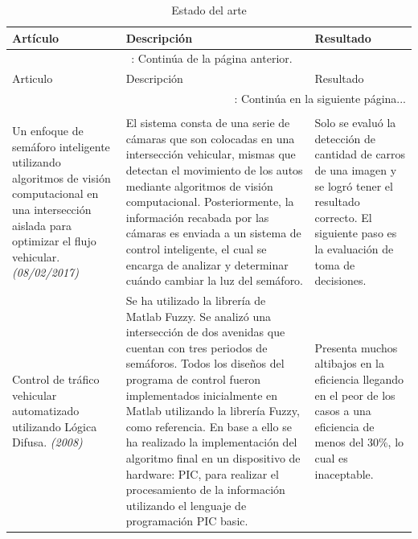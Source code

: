 \begin{center}
	\begin{longtable}{|p{2.7cm}|p{7cm}|p{5.0cm}|}
		

		
		\hline Artículo & Descripción & Resultado \\ \hline
		\endfirsthead
		
		\multicolumn{3}{c}{{\tablename\ \thetable{}: Continúa de la página anterior.}}\\

		\hline Articulo & Descripción & Resultado \\ \hline
		\endhead
		
		\multicolumn{3}{r}{{\tablename\ \thetable{}: Continúa en la siguiente página...}}\\
		\endfoot
		
		\caption[Estado del arte]{Estado del arte}\label{table:estadodelarte}\\
		\endlastfoot
		

		
		Un enfoque de semáforo inteligente utilizando algoritmos de visión computacional en una intersección aislada para optimizar el flujo vehicular.\cite{garciag} \newline \emph{(08/02/2017)} &
		El sistema consta de una serie de cámaras que son colocadas en una intersección vehicular, mismas que detectan el movimiento de los autos mediante algoritmos de visión computacional.
		Posteriormente, la información recabada por las cámaras es enviada a un sistema de control inteligente, el cual se encarga de analizar y determinar cuándo cambiar la luz del semáforo.&
		Solo se evaluó la detección de cantidad de carros de una imagen y se logró tener el resultado correcto. El siguiente paso es la evaluación de toma de decisiones.\\ \hline
		
		
		Control de tráfico vehicular automatizado utilizando Lógica Difusa.\cite{alvaroer} \newline \emph{(2008)} &
		Se ha utilizado la librería de Matlab Fuzzy. Se analizó una intersección de dos avenidas que cuentan con tres periodos de semáforos.  Todos los diseños del programa de control fueron implementados inicialmente en Matlab utilizando la librería Fuzzy, como referencia. En base a ello se ha realizado la implementación del algoritmo final en un dispositivo de hardware: PIC, para realizar el procesamiento de la información utilizando el lenguaje de programación PIC basic.&
		Presenta muchos altibajos en la eficiencia llegando en el peor de los casos a una eficiencia de menos del 30\%, lo cual es inaceptable.\\ \hline
		

\end{longtable}
\end{center}
